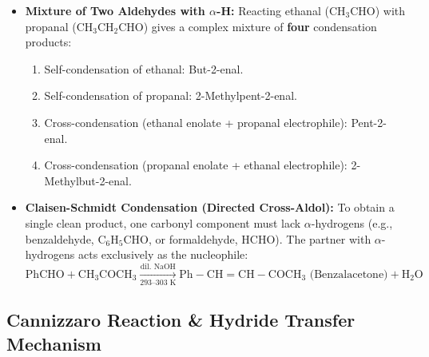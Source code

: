 \documentclass[10pt,a4paper]{article}
\begin{document}
\begin{trapbox}
\begin{itemize}
  \item \textbf{Mixture of Two Aldehydes with $\alpha$-H:}
  Reacting ethanal ($\mathrm{CH_3CHO}$) with propanal ($\mathrm{CH_3CH_2CHO}$) gives a complex mixture of \textbf{four} condensation products:
  \begin{enumerate}
    \item Self-condensation of ethanal: But-2-enal.
    \item Self-condensation of propanal: 2-Methylpent-2-enal.
    \item Cross-condensation (ethanal enolate + propanal electrophile): Pent-2-enal.
    \item Cross-condensation (propanal enolate + ethanal electrophile): 2-Methylbut-2-enal.
  \end{enumerate}
  \item \textbf{Claisen-Schmidt Condensation (Directed Cross-Aldol):}
  To obtain a single clean product, one carbonyl component must lack $\alpha$-hydrogens (e.g., benzaldehyde, $\mathrm{C_6H_5CHO}$, or formaldehyde, $\mathrm{HCHO}$). The partner with $\alpha$-hydrogens acts exclusively as the nucleophile:
  \begin{equation}
    \mathrm{PhCHO} + \mathrm{CH_3COCH_3} \xrightarrow[\text{293--303 K}]{\text{dil. } \mathrm{NaOH}} \mathrm{Ph-CH=CH-COCH_3} \text{ (Benzalacetone)} + \mathrm{H_2O}
  \end{equation}
\end{itemize}
\end{trapbox}

\subsection{Cannizzaro Reaction \& Hydride Transfer Mechanism}
\end{document}
